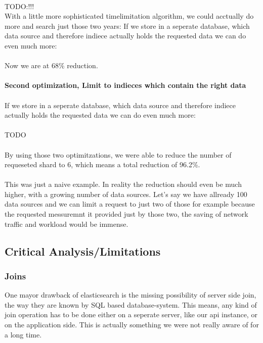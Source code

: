 \\
TODO:!!!
\\
With a little more sophisticated timelimitation algorithm, we could acctually do more and search just those two years:
If we store in a seperate database, which data source and therefore indiece actually holds the requested data we can do even much more:\\
\\
Now we are at 68\% reduction.\\
\\
\textbf{Second optimization, Limit to indieces which contain the right data}\\
\\
If we store in a seperate database, which data source and therefore indiece actually holds the requested data we can do even much more:\\
\\
TODO\\
\\
By using those two optimitzations, we were able to reduce the number of requeseted shard to 6, which means a total reduction of 96.2\%.\\
\\
This was just a naive example. In reality the reduction should even be much higher, with a growing number of data sources.
Let's say we have allready 100 data sources and we can limit a request to just two of those for example because the requested messuremnt it
provided just by those two, the saving of network traffic and workload would be immense.
\subsection{Critical Analysis/Limitations}
\subsubsection{Joins}
One mayor drawback of elasticsearch is the missing possibility of server side join, the way they are known by SQL based database-system. 
This means, any kind of join operation has to be done either on a seperate server, like our api instance, or on the application side. 
This is actually something we were not really aware of for a long time.